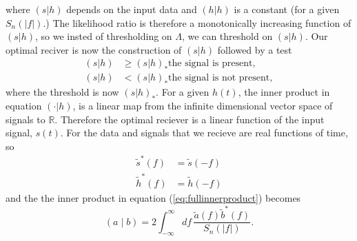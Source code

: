 where $(s|h)$ depends on the input data and $(h|h)$ is a constant (for a
given $S_n(|f|)$.) The likelihood ratio is therefore a monotonically
increasing function of $(s|h)$, so we insted of thresholding on $\Lambda$, we
can threshold on $(s|h)$. Our optimal reciver is now the construction of $(s|h)$
followed by a test
\begin{equation}
\begin{split}
(s|h) &\ge (s|h)_\ast \text{the signal is present}, \\
(s|h) &< (s|h)_\ast \text{the signal is not present},
\end{split}
\end{equation}
where the threshold is now $(s|h)_\ast$. For a given $h(t)$, the inner
product in equation $(\cdot|h)$, is a linear map from the infinite dimensional
vector space of signals to $\mathbb{R}$. Therefore the optimal reciever is a
linear function of the input signal, $s(t)$. For the data and signals that we
recieve are real functions of time, so 
\begin{align}
\tilde{s}^\ast(f) &= \tilde{s}(-f) \\
\tilde{h}^\ast(f) &= \tilde{h}(-f)
\end{align}
and the the inner product in equation (\ref{eq:fullinnerproduct}) becomes
\begin{equation}
\left(a\mid b\right) = 2 \int_{-\infty}^{\infty}df\,
\frac{\tilde{a}(f)\tilde{b}^\ast(f)}{S_n\left(\left|f\right|\right)}.
\label{eq:innerproduct}
\end{equation}

